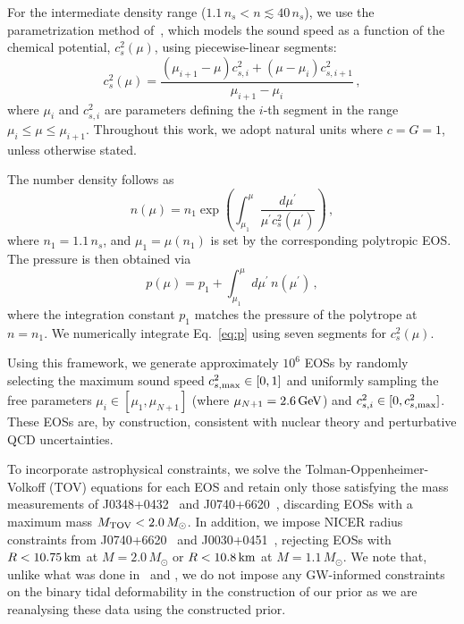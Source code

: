 \documentclass[twocolumn]{aastex631}
\begin{document}
For the intermediate density range ($1.1\,n_s < n \lesssim 40\,n_s$), we
use the parametrization method of~\citet{Annala2019}, which models the
sound speed as a function of the chemical potential, $c_s^2(\mu)$, using
piecewise-linear segments:
%
\begin{equation} \label{eq:cs2}
 c_s^2(\mu) = \frac{\left(\mu_{i+1}-\mu \right) c_{s,i}^2 + \left(\mu -
   \mu_i \right) c_{s,i+1}^2}{\mu_{i+1}-\mu_i}\,,
\end{equation}
%
where $\mu_i$ and $c_{s,i}^2$ are parameters defining the $i$-th segment
in the range $\mu_i \leq \mu \leq \mu_{i+1}$. Throughout this work, we
adopt natural units where $c=G=1$, unless otherwise stated.

The number density follows as 
%
\begin{equation} \label{eq:n}
 n(\mu) = n_1 \exp \left({\int_{\mu_1}^\mu \frac{d\mu^\prime}{\mu^\prime
     c_s^2(\mu^\prime)}}\right)\,,
\end{equation} 
%
where $n_1 = 1.1\,n_s$, and $\mu_1 = \mu(n_1)$ is set by the
corresponding polytropic EOS. The pressure is then obtained via
%
\begin{equation} \label{eq:p}
 p(\mu) = p_1 + \int_{\mu_1}^\mu d\mu^\prime \, n(\mu^\prime)\,,
\end{equation}
%
where the integration constant $p_1$ matches the pressure of the
polytrope at $n = n_1$. We numerically integrate Eq.~\eqref{eq:p} using
seven segments for $c_s^2(\mu)$.

Using this framework, we generate approximately $10^6$ EOSs by randomly
selecting the maximum sound speed $c_{s,{\rm max}}^2 \in [0,1]$ and
uniformly sampling the free parameters $\mu_i \in [\mu_1, \mu_{N+1}]$
(where $\mu_{N+1} = 2.6\,\rm GeV$) and $c_{s,i}^2 \in [0, c_{s,{\rm
      max}}^2]$. These EOSs are, by construction, consistent with
nuclear theory and perturbative QCD uncertainties.

To incorporate astrophysical constraints, we solve the
Tolman-Oppenheimer-Volkoff (TOV) equations for each EOS and retain only
those satisfying the mass measurements of J0348+0432~\citep[][$M =
  2.01\pm 0.04\,M_{\odot}$]{Antoniadis2013} and J0740+6620~\citep[][$M =
  2.08 \pm 0.07\,M_{\odot}$]{Cromartie2019, Fonseca2021}, discarding EOSs
with a maximum mass $M_{\rm TOV} < 2.0\,M_{\odot}$. In addition, we
impose NICER radius constraints from J0740+6620~\citep{Miller2021,
  Riley2021} and J0030+0451~\citep{Riley2019, MCMiller2019b}, rejecting
EOSs with $R < 10.75\,\rm km$ at $M = 2.0\,M_{\odot}$ or $R < 10.8\,\rm
km$ at $M = 1.1\,M_{\odot}$. We note that, unlike what was done
in~\citet{Altiparmak:2022} and \citet{Ecker:2022dlg}, we do not impose any
GW-informed constraints on the binary tidal deformability in the
construction of our prior as we are reanalysing these data using the
constructed prior.
	
\end{document}
